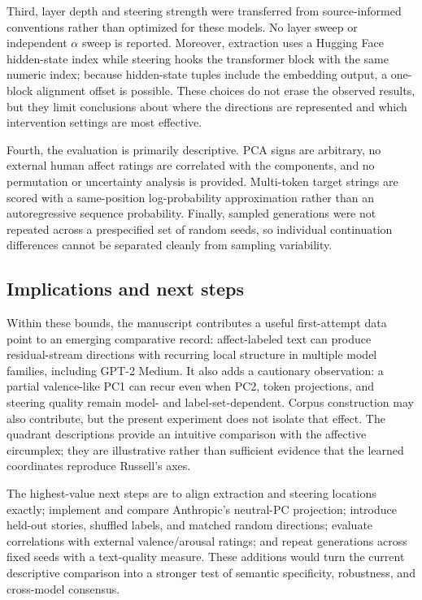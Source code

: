 Third, layer depth and steering strength were transferred from source-informed conventions rather than optimized for these models. 
No layer sweep or independent $\alpha$ sweep is reported. Moreover, extraction uses a Hugging Face hidden-state index while 
steering hooks the transformer block with the same numeric index; because hidden-state tuples include the embedding output, 
a one-block alignment offset is possible. These choices do not erase the observed results, but they limit conclusions about 
where the directions are represented and which intervention settings are most effective.

Fourth, the evaluation is primarily descriptive. PCA signs are arbitrary, no external human affect ratings are correlated with 
the components, and no permutation or uncertainty analysis is provided. Multi-token target strings are scored with a same-position 
log-probability approximation rather than an autoregressive sequence probability. Finally, sampled generations were not repeated 
across a prespecified set of random seeds, so individual continuation differences cannot be separated cleanly from sampling variability.

\subsection{Implications and next steps}

Within these bounds, the manuscript contributes a useful first-attempt data point to an emerging comparative record: affect-labeled text 
can produce residual-stream directions with recurring local structure in multiple model families, including GPT-2 Medium. It also adds 
a cautionary observation: a partial valence-like PC1 can recur even when PC2, token projections, and steering quality remain 
model- and label-set-dependent. Corpus construction may also contribute, but the present experiment does not isolate that effect. 
The quadrant descriptions provide an intuitive comparison with the affective circumplex; they are illustrative rather than sufficient 
evidence that the learned coordinates reproduce Russell's axes.

The highest-value next steps are to align extraction and steering locations exactly; implement and compare Anthropic's neutral-PC 
projection; introduce held-out stories, shuffled labels, and matched random directions; evaluate correlations with external 
valence/arousal ratings; and repeat generations across fixed seeds with a text-quality measure. These additions would turn the 
current descriptive comparison into a stronger test of semantic specificity, robustness, and cross-model consensus.
